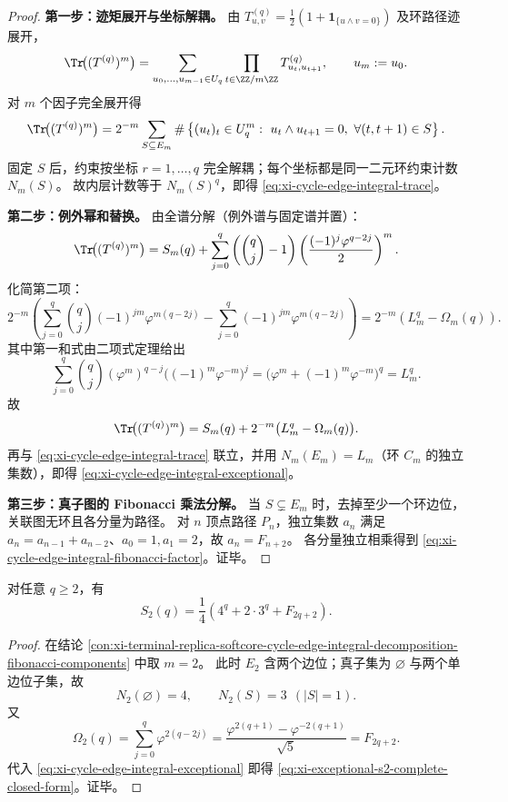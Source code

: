 \begin{proof}
\textbf{第一步：迹矩展开与坐标解耦。}
由
\(
T^{(q)}_{u,v}=\frac12(1+\mathbf 1_{\{u\wedge v=0\}})
\)
及环路径迹展开，
\[
\Tr\!\bigl((T^{(q)})^m\bigr)
=\sum_{u_0,\dots,u_{m-1}\in U_q}
\prod_{t\in\ZZ/m\ZZ}T^{(q)}_{u_t,u_{t+1}},\qquad u_m:=u_0.
\]
对 \(m\) 个因子完全展开得
\[
\Tr\!\bigl((T^{(q)})^m\bigr)
=2^{-m}\sum_{S\subseteq E_m}
\#\left\{(u_t)_t\in U_q^m:\ u_t\wedge u_{t+1}=0,\ \forall (t,t+1)\in S\right\}.
\]
固定 \(S\) 后，约束按坐标 \(r=1,\dots,q\) 完全解耦；每个坐标都是同一二元环约束计数 \(N_m(S)\)。
故内层计数等于 \(N_m(S)^q\)，即得 \eqref{eq:xi-cycle-edge-integral-trace}。

\textbf{第二步：例外幂和替换。}
由全谱分解（例外谱与固定谱并置）：
\[
\Tr\!\bigl((T^{(q)})^m\bigr)
=S_m(q)+\sum_{j=0}^{q}\left(\binom{q}{j}-1\right)
\left(\frac{(-1)^j\varphi^{q-2j}}{2}\right)^m.
\]
化简第二项：
\[
2^{-m}\!\left(
\sum_{j=0}^{q}\binom{q}{j}(-1)^{jm}\varphi^{m(q-2j)}
-\sum_{j=0}^{q}(-1)^{jm}\varphi^{m(q-2j)}
\right)
=2^{-m}\!\left(L_m^q-\Omega_m(q)\right).
\]
其中第一和式由二项式定理给出
\[
\sum_{j=0}^{q}\binom{q}{j}(\varphi^m)^{q-j}\bigl((-1)^m\varphi^{-m}\bigr)^j
=\bigl(\varphi^m+(-1)^m\varphi^{-m}\bigr)^q=L_m^q.
\]
故
\[
\Tr\!\bigl((T^{(q)})^m\bigr)=S_m(q)+2^{-m}\bigl(L_m^q-\Omega_m(q)\bigr).
\]
再与 \eqref{eq:xi-cycle-edge-integral-trace} 联立，并用 \(N_m(E_m)=L_m\)（环 \(C_m\) 的独立集数），即得
\eqref{eq:xi-cycle-edge-integral-exceptional}。

\textbf{第三步：真子图的 Fibonacci 乘法分解。}
当 \(S\subsetneq E_m\) 时，去掉至少一个环边位，关联图无环且各分量为路径。
对 \(n\) 顶点路径 \(P_n\)，独立集数 \(a_n\) 满足
\(
a_n=a_{n-1}+a_{n-2}
\)、\(a_0=1,a_1=2\)，故 \(a_n=F_{n+2}\)。
各分量独立相乘得到 \eqref{eq:xi-cycle-edge-integral-fibonacci-factor}。证毕。
\end{proof}

\begin{corollary}\label{cor:xi-terminal-replica-softcore-exceptional-power-sum-m2-fibonacci-closed}
对任意 \(q\ge 2\)，有
\begin{equation}\label{eq:xi-exceptional-s2-complete-closed-form}
S_2(q)=\frac14\left(4^q+2\cdot 3^q+F_{2q+2}\right).
\end{equation}
\end{corollary}

\begin{proof}
在结论 \ref{con:xi-terminal-replica-softcore-cycle-edge-integral-decomposition-fibonacci-components} 中取 \(m=2\)。
此时 \(E_2\) 含两个边位；真子集为 \(\varnothing\) 与两个单边位子集，故
\[
N_2(\varnothing)=4,\qquad N_2(S)=3\ \ (|S|=1).
\]
又
\[
\Omega_2(q)=\sum_{j=0}^{q}\varphi^{2(q-2j)}
=\frac{\varphi^{2(q+1)}-\varphi^{-2(q+1)}}{\sqrt5}
=F_{2q+2}.
\]
代入 \eqref{eq:xi-cycle-edge-integral-exceptional} 即得 \eqref{eq:xi-exceptional-s2-complete-closed-form}。证毕。
\end{proof}

